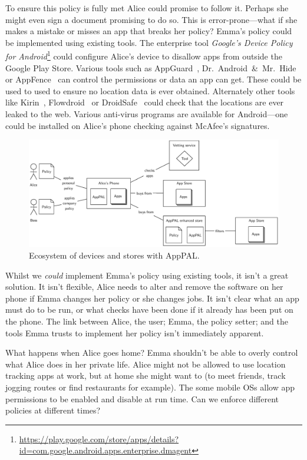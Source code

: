 \documentclass[]{scrartcl}
\begin{document}
To ensure this policy is fully met Alice could promise to follow it.
Perhaps she might even sign a document promising to do so.
This is error-prone---what if she makes a mistake or misses an app that breaks her policy?
Emma's policy could be implemented using existing tools.
The enterprise tool \emph{Google's Device Policy for Android}\footnote{\url{https://play.google.com/store/apps/details?id=com.google.android.apps.enterprise.dmagent}}
  could configure Alice's device to disallow apps from outside the Google Play Store.
Various tools such as AppGuard~\citep{Backes:2012vm}, Dr.~Android~\&~Mr.~Hide~\citep{Jeon:2012ki} or AppFence~\citep{Hornyack:2011wq} can control the permissions or data an app can get.
These could be used to used to ensure no location data is ever obtained.
Alternately other tools like Kirin~\citep{Enck:2009ko}, Flowdroid~\citep{Fritz:2013vi} or DroidSafe~\citep{Gordon:2015et} could check that the locations are ever leaked to the web.
Various anti-virus programs are available for Android---one could be installed on Alice's phone checking against McAfee's signatures.

\begin{figure}
\includegraphics{figures/overview.eps}
\caption{Ecosystem of devices and stores with AppPAL.}
\label{fig:ecosystem}
\end{figure}

Whilst we \emph{could} implement Emma's policy using existing tools, it isn't a great solution.
It isn't flexible, Alice needs to alter and remove the software on her phone if Emma changes her policy or she changes jobs.
It isn't clear what an app must do to be run, or what checks have been done if it already has been put on the phone.
The link between Alice, the user; Emma, the policy setter; and the tools Emma trusts to implement her policy isn't immediately apparent.

What happens when Alice goes home?
Emma shouldn't be able to overly control what Alice does in her private life.
Alice might not be allowed to use location tracking apps at work, but at home she might want to (to meet friends, track jogging routes or find restaurants for example).
The some mobile OSs allow app permissions to be enabled and disable at run time.
Can we enforce different policies at different times?
\end{document}
